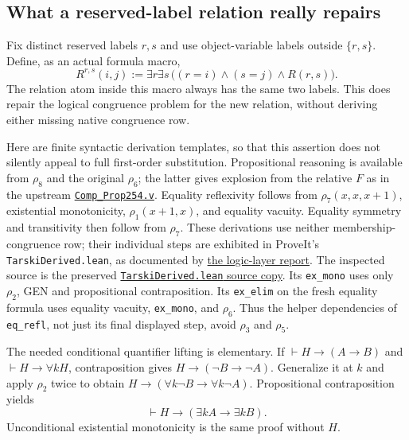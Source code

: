 \subsection{What a reserved-label relation really repairs}

Fix distinct reserved labels $r,s$ and use object-variable labels outside
$\{r,s\}$. Define, as an actual formula macro,
\[
 R^{r,s}(i,j):=\exists r\exists s\,
       \bigl((r=i)\land(s=j)\land R(r,s)\bigr).
\]
The relation atom inside this macro always has the same two labels.
This does repair the logical congruence problem for the new relation,
without deriving either missing native congruence row.

Here are finite syntactic derivation templates, so that this assertion
does not silently appeal to full first-order substitution. Propositional
reasoning is available from $\rho_8$ and the original $\rho_6$; the latter
gives explosion from the relative $F$ as in the upstream
\href{https://github.com/jeff87654/busy-beaver/blob/zf-254/ZF/m254/coq/logic/Comp_Prop254.v}{\texttt{Comp\_Prop254.v}}.
Equality reflexivity follows from $\rho_7(x,x,x+1)$, existential
monotonicity, $\rho_1(x+1,x)$, and equality vacuity. Equality symmetry
and transitivity then follow from $\rho_7$. These derivations use neither
membership-congruence row; their individual steps are exhibited in
ProveIt's \texttt{TarskiDerived.lean}, as documented by
\href{https://github.com/VladimirReshetnikov/ProveIt/blob/6446ff5668307a2ac6aee1896037f0b792090389/Computability/BusyBeaver/Research/ZFC/tarski_logic_layer.md}{the logic-layer report}.
The inspected source is the preserved
\href{https://github.com/VladimirReshetnikov/ProveIt/blob/6446ff5668307a2ac6aee1896037f0b792090389/SetTheory/Cardinals/docs/reports/set-theory/zfc-closure-kernels/code/35-dirty-formal-src-BusyBeaver-ZFC-TarskiDerived.lean}{\texttt{TarskiDerived.lean} source copy}.
Its \texttt{ex\_mono} uses only $\rho_2$, GEN and propositional
contraposition. Its \texttt{ex\_elim} on the fresh equality formula uses
equality vacuity, \texttt{ex\_mono}, and $\rho_6$. Thus the helper
dependencies of \texttt{eq\_refl}, not just its final displayed step,
avoid $\rho_3$ and $\rho_5$.

The needed conditional quantifier lifting is elementary. If
$\vdash H\to(A\to B)$ and $\vdash H\to\forall kH$, contraposition
gives $H\to(\neg B\to\neg A)$. Generalize it at $k$ and apply
$\rho_2$ twice to obtain
$H\to(\forall k\neg B\to\forall k\neg A)$.
Propositional contraposition yields
\[
 \vdash H\to(\exists k A\to\exists k B).
\]
Unconditional existential monotonicity is the same proof without $H$.

